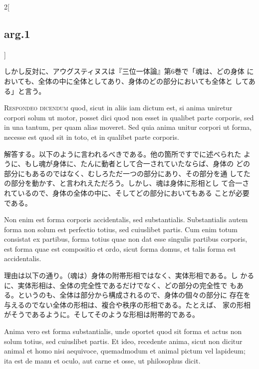 \documentclass[paper=a4paper,fontsize=10pt,jafontsize=9pt,titlepage]{jlreq}
\begin{document}
\begin{paracol}{2}[\subsection{arg.1}]
 \switchcolumn

 しかし反対に、アウグスティヌスは『三位一体論』第6巻で「魂は、どの身体
 においても、全体の中に全体としてあり、身体のどの部分においても全体と
 してある」と言う。




 {\scshape Respondeo dicendum} quod, sicut in aliis iam dictum est, si
 anima uniretur corpori solum ut motor, posset dici quod non esset in
 qualibet parte corporis, sed in una tantum, per quam alias
 moveret. Sed quia anima unitur corpori ut forma, necesse est quod sit
 in toto, et in qualibet parte corporis. 

\switchcolumn

 解答する。以下のように言われるべきである。他の箇所ですでに述べられた
 ように、もし魂が身体に、たんに動者として合一されていたならば、身体の
 どの部分にもあるのではなく、むしろただ一つの部分にあり、その部分を通
 してたの部分を動かす、と言われえただろう。しかし、魂は身体に形相とし
 て合一されているので、身体の全体の中に、そしてどの部分においてもある
 ことが必要である。
 
 
\switchcolumn*


 Non enim est forma corporis accidentalis, sed substantialis.
 Substantialis autem forma non solum est perfectio totius, sed
 cuiuslibet partis. Cum enim totum consistat ex partibus, forma totius
 quae non dat esse singulis partibus corporis, est forma quae est
 compositio et ordo, sicut forma domus, et talis forma est
 accidentalis.

\switchcolumn

 理由は以下の通り。（魂は）身体の附帯形相ではなく、実体形相である。し
 かるに、実体形相は、全体の完全性であるだけでなく、どの部分の完全性で
 もある。というのも、全体は部分から構成されるので、身体の個々の部分に
 存在を与えるのでない全体の形相は、複合や秩序の形相である。たとえば、
 家の形相がそうであるように。そしてそのような形相は附帯的である。
 
\switchcolumn*


 Anima vero est forma substantialis,
 unde oportet quod sit forma et actus non solum totius, sed cuiuslibet
 partis. Et ideo, recedente anima, sicut non dicitur animal et homo
 nisi aequivoce, quemadmodum et animal pictum vel lapideum; ita est de
 manu et oculo, aut carne et osse, ut philosophus dicit.


\end{paracol}
\end{document}
